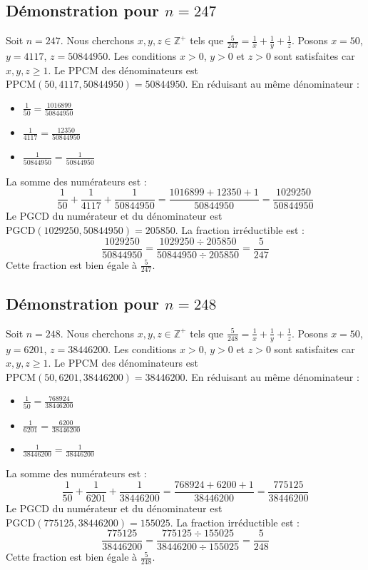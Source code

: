 \documentclass[11pt,a4paper]{article}
\begin{document}
\subsection{Démonstration pour $n = 247$}
Soit $n = 247$. Nous cherchons $x, y, z \in \mathbb{Z}^{+}$ tels que $\frac{5}{247} = \frac{1}{x} + \frac{1}{y} + \frac{1}{z}$.
Posons $x = 50$, $y = 4117$, $z = 50844950$.
Les conditions $x > 0$, $y > 0$ et $z > 0$ sont satisfaites car $x, y, z \geq 1$.
Le PPCM des dénominateurs est $\text{PPCM}(50, 4117, 50844950) = 50844950$.
En réduisant au même dénominateur :
\begin{itemize}
    \item $\frac{1}{50} = \frac{1016899}{50844950}$
    \item $\frac{1}{4117} = \frac{12350}{50844950}$
    \item $\frac{1}{50844950} = \frac{1}{50844950}$
\end{itemize}
La somme des numérateurs est :
$$ \frac{1}{50} + \frac{1}{4117} + \frac{1}{50844950} = \frac{1016899 + 12350 + 1}{50844950} = \frac{1029250}{50844950} $$
Le PGCD du numérateur et du dénominateur est $\text{PGCD}(1029250, 50844950) = 205850$.
La fraction irréductible est :
$$ \frac{1029250}{50844950} = \frac{1029250 \div 205850}{50844950 \div 205850} = \frac{5}{247} $$
Cette fraction est bien égale à $\frac{5}{247}$.

\subsection{Démonstration pour $n = 248$}
Soit $n = 248$. Nous cherchons $x, y, z \in \mathbb{Z}^{+}$ tels que $\frac{5}{248} = \frac{1}{x} + \frac{1}{y} + \frac{1}{z}$.
Posons $x = 50$, $y = 6201$, $z = 38446200$.
Les conditions $x > 0$, $y > 0$ et $z > 0$ sont satisfaites car $x, y, z \geq 1$.
Le PPCM des dénominateurs est $\text{PPCM}(50, 6201, 38446200) = 38446200$.
En réduisant au même dénominateur :
\begin{itemize}
    \item $\frac{1}{50} = \frac{768924}{38446200}$
    \item $\frac{1}{6201} = \frac{6200}{38446200}$
    \item $\frac{1}{38446200} = \frac{1}{38446200}$
\end{itemize}
La somme des numérateurs est :
$$ \frac{1}{50} + \frac{1}{6201} + \frac{1}{38446200} = \frac{768924 + 6200 + 1}{38446200} = \frac{775125}{38446200} $$
Le PGCD du numérateur et du dénominateur est $\text{PGCD}(775125, 38446200) = 155025$.
La fraction irréductible est :
$$ \frac{775125}{38446200} = \frac{775125 \div 155025}{38446200 \div 155025} = \frac{5}{248} $$
Cette fraction est bien égale à $\frac{5}{248}$.
\end{document}

